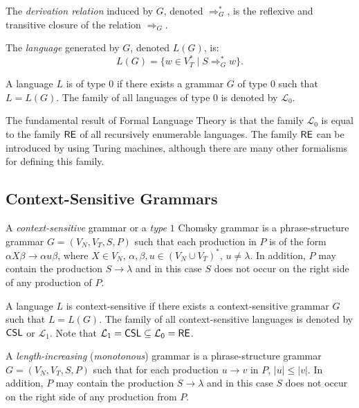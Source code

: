 The \emph{derivation relation} induced by $G$, denoted $\Rightarrow^*_G$, is the reflexive and transitive closure of the relation $\Rightarrow_G$.

The \emph{language} generated by $G$, denoted $L(G)$, is: $$L(G) = \{w \in V_T^* \mid S \Rightarrow^*_G w\}.$$

A language $L$ is of type $0$ if there exists a grammar $G$ of type $0$ such that $L = L(G)$. The family of all languages of type $0$ is denoted by $\mathcal{L}_0$.

The fundamental result of Formal Language Theory is that the family $\mathcal{L}_0$ is equal to the family \index{$\RE$}$\RE$ of all recursively enumerable languages. The family $\RE$ can be introduced by using Turing machines, although there are many other formalisms for defining this family.

\subsection{Context-Sensitive Grammars}
\label{subsection:context-sensitive-grammars}

A \emph{context-sensitive} grammar or a \emph{type $1$} Chomsky grammar is a phrase-structure grammar $G = (V_N, V_T, S, P)$ such that each production in $P$ is of the form $\alpha X \beta \to \alpha u \beta$, where $X \in V_N$, $\alpha, \beta, u \in (V_N \cup V_T)^*$, $u \neq \lambda$. In addition, $P$ may contain the production $S \to \lambda$ and in this case $S$ does not occur on the right side of any production of $P$.

A language $L$ is context-sensitive if there exists a context-sensitive grammar $G$ such that $L = L(G)$. The family of all context-sensitive languages is denoted by \index{$\CSL$}$\CSL$ or $\mathcal{L}_1$. Note that $\mathcal{L}_1 = \textup{\sf CSL} \subseteq \mathcal{L}_0 = \textup{\sf RE}$.

A \emph{length-increasing} (\emph{monotonous}) grammar is a phrase-structure grammar $G = (V_N, V_T, S, P)$ such that for each production $u \to v$ in $P$, $|u| \le |v|$. In addition, $P$ may contain the production $S \to \lambda$ and in this case $S$ does not occur on the right side of any production from $P$.

